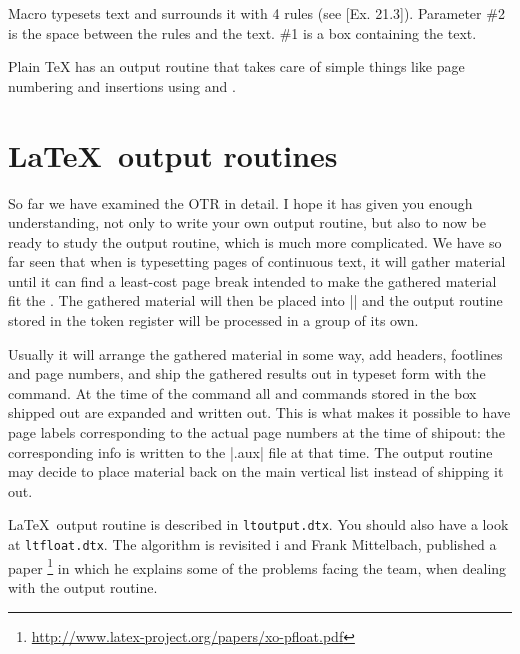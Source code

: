 Macro  typesets text and surrounds it
with 4 rules (see [Ex. 21.3]). Parameter \#2 is the
space between the rules and the text. \#1 is a box
containing the text.



Plain TeX has an output routine that takes care of  simple things like page numbering and insertions
using  and . 

\section{\LaTeX\  output routines}

So far we have examined the \tex OTR in detail. I hope it has given you enough understanding, not only to write your own output routine, but also to now be ready to study the \latex output routine, which is much more complicated. We have so far seen that  when \tex 
is typesetting pages of continuous text, it will gather material until it can find a least-cost page break intended to
make the gathered material fit the . The
gathered material will then be placed into || and
the output routine stored in the token register 
will be processed in a group of its own. 

Usually it will
arrange the gathered material in some way, add headers,
footlines and page numbers, and ship the gathered results out in typeset form with the  command.
At the time of the  command all  and
 commands stored in the box shipped out are expanded and written out. This is what makes it possible to have page labels corresponding to the actual page
numbers at the time of shipout: the corresponding info
is written to the |.aux| file at that time.
The output routine may decide to place material
back on the main vertical list instead of shipping it out.

\LaTeX\ output routine is described in \texttt{ltoutput.dtx}. You should also have a look at \texttt{ltfloat.dtx}. The algorithm is revisited i  and Frank Mittelbach, published a paper
\footnote{\protect\url{http://www.latex-project.org/papers/xo-pfloat.pdf}} in which he explains some of the problems facing the team, when dealing with the output routine.



